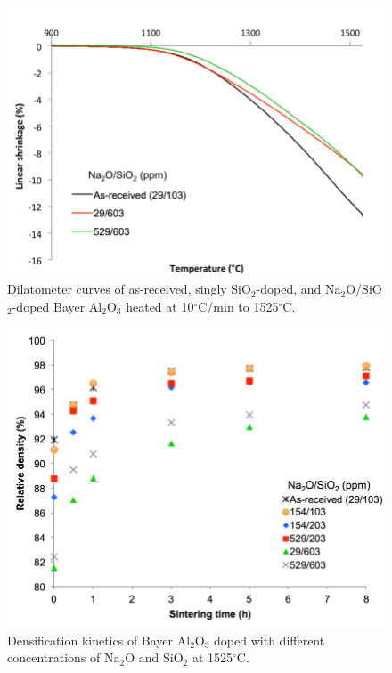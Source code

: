 \newpage
\begin{figure}[H]
	\centering
	\includegraphics[width=\textwidth]{Chapter-2/Figures/Figure5.png}
	\caption{Dilatometer curves of as-received, singly SiO$_{2}$-doped, and Na$_{2}$O/SiO$_{2}$-doped Bayer Al$_{2}$O$_{3}$ heated at 10$^{\circ}$C/min to 1525$^{\circ}$C.}
	\label{Ch2-figure:Figure5}
\end{figure}

\newpage
\begin{figure}[H]
	\centering
	\includegraphics[width=\textwidth]{Chapter-2/Figures/Figure6.png}
	\caption{Densification kinetics of Bayer Al$_{2}$O$_{3}$ doped with different concentrations of Na$_{2}$O and SiO$_{2}$ at 1525$^{\circ}$C.}
	\label{Ch2-figure:Figure6}
\end{figure}

